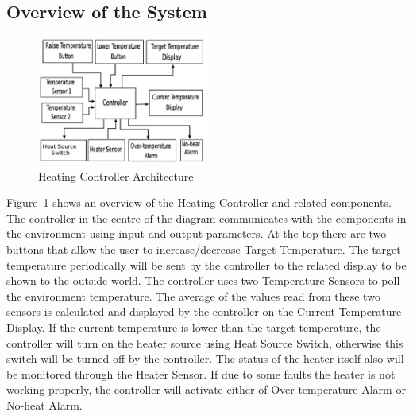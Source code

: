 \subsection{Overview of the System}
%
\begin{figure}
	\centering
		\includegraphics[width=0.5\textwidth]{pictures/arch.eps}
	\caption{Heating Controller Architecture}
	\label{fig:arch}
\end{figure}
Figure~\ref{fig:arch} shows an overview of the Heating Controller and related components. The controller in the centre of the diagram communicates with the components in the environment using input and output parameters. At the top there are two buttons that allow the user to increase/decrease Target Temperature. The target temperature periodically will be sent by the controller to the related display to be shown to the outside world. The controller uses two Temperature Sensors to poll the environment temperature. The average of the values read from these two sensors is calculated and displayed by the controller on the Current Temperature Display. If the current temperature is lower than the target temperature, the controller will turn on the heater source using Heat Source Switch, otherwise this switch will be turned off by the controller. The status of the heater itself also will be monitored through the Heater Sensor. If due to some faults the heater is not working properly, the controller will activate either of Over-temperature Alarm or No-heat Alarm.  
%
